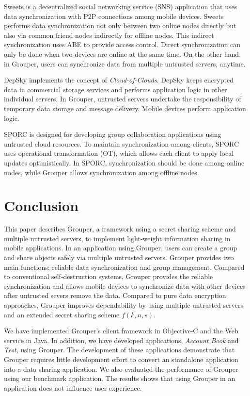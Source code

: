 \documentclass[sigconf]{acmart}
\begin{document}
Sweets\cite{sweets} is a decentralized social networking service (SNS) application that uses data synchronization with P2P connections among mobile devices. 
Sweets performs data synchronization not only between two online nodes directly but also via common friend nodes indirectly for offline nodes.
This indirect synchronization uses ABE to provide access control.
Direct synchronization can only be done when two devices are online at the same time. 
On the other hand, in Grouper, users can synchronize data from multiple untrusted servers, anytime.

DepSky\cite{bessani2013depsky} implements the concept of \emph{Cloud-of-Clouds}.  
DepSky keeps encrypted data in commercial storage services and performs application logic in other individual servers.
In Grouper, untrusted servers undertake the responsibility of temporary data storage and message delivery.
Mobile devices perform application logic.

SPORC\cite{feldman2010sporc} is designed for developing group collaboration applications using untrusted cloud resources.
To maintain synchronization among clients, SPORC uses operational transformation (OT), which allows each client to apply local updates optimistically.
In SPORC, synchronization should be done among online nodes, while Grouper allows synchronization among offline nodes.

\section{Conclusion}

This paper describes Grouper, a framework using a secret sharing scheme and multiple untrusted servers, to implement light-weight information sharing in mobile applications.
In an application using Grouper, users can create a group and share objects safely via multiple untrusted servers.
Grouper provides two main functions: reliable data synchronization and group management.
Compared to conventional self-destruction systems, Grouper provides the reliable synchronization and allows mobile devices to synchronize data with other devices after untrusted severs remove the data.
Compared to pure data encryption approaches, Grouper improves dependability by using multiple untrusted servers and an extended secret sharing scheme $f(k, n, s)$.

We have implemented Grouper's client framework in Objective-C and the Web service in Java. 
In addition, we have developed applications, \emph{Account Book} and \emph{Test}, using Grouper.
The development of these applications demonstrate that Grouper requires little development effort to convert an standalone application into a data sharing application.
We also evaluated the performance of Grouper using our benchmark application.
The results shows that using Grouper in an application does not influence user experience.
\end{document}
